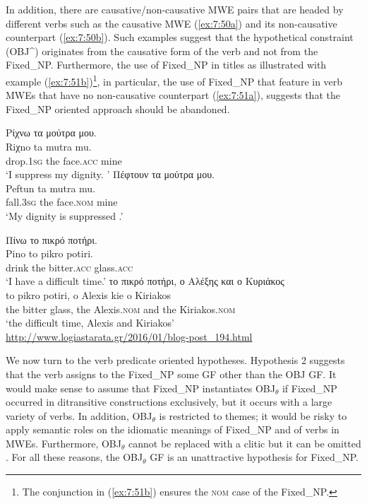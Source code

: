 \documentclass[output=paper]{langsci/langscibook}
\begin{document}
In addition, there are causative/non-causative MWE pairs that are headed by different verbs such as the causative MWE (\ref{ex:7:50a}) and its non-causative counterpart (\ref{ex:7:50b}). Such examples suggest that the hypothetical constraint (OBJ\^{})  originates from  the causative form of the verb and not from the Fixed\_NP. Furthermore, the use of Fixed\_NP in titles as illustrated with example (\ref{ex:7:51b})\footnote{The conjunction in (\ref{ex:7:51b}) ensures the \textsc{nom} case of  the Fixed\_NP.}, in particular, the use of Fixed\_NP that feature in verb MWEs that have no non-causative counterpart (\ref{ex:7:51a}), suggests that the Fixed\_NP oriented approach should be abandoned.   


\ea%
\label{ex:7:50}
\ea \label{ex:7:50a}
\glll Ρίχνω τα μούτρα μου.\\
Riχno ta mutra mu.\\
        drop.\textsc{1sg} the face.\textsc{acc} mine\\
\glt `I suppress my dignity. '
\ex \label{ex:7:50b}
\glll Πέφτουν τα μούτρα μου.\\
Peftun ta mutra mu.\\
         fall.\textsc{3sg} the face.\textsc{nom} mine\\
\glt   `My dignity is suppressed .'
\z
\z


\ea%
\label{ex:7:51}
\ea \label{ex:7:51a}
\glll Πίνω το πικρό ποτήρι.\\
Pino to pikro potiri.\\
            drink the bitter.\textsc{acc} glass.\textsc{acc}\\
\glt   `I have a difficult time.'
\ex \label{ex:7:51b}
\glll το πικρό ποτήρι, ο Αλέξης και ο Κυριάκος\\
to pikro potiri, o Alexis kie o Kiriakos\\
     the bitter glass, the Alexis.\textsc{nom} and the Kiriakos.\textsc{nom}\\
\glt   `the difficult time, Alexis and Kiriakos'\\
\url{http://www.logiastarata.gr/2016/01/blog-post_194.html} 
\z
\z

We now turn to the verb predicate oriented hypotheses. Hypothesis 2 suggests that the verb assigns to the Fixed\_NP some GF other than the OBJ GF.  It would make sense to assume that Fixed\_NP instantiates OBJ$_\theta$ if Fixed\_NP occurred in ditransitive constructions exclusively, but it occurs with a large variety of verbs. In addition, OBJ$_\theta$ is restricted to themes; it would be risky to apply semantic roles on the idiomatic meanings of Fixed\_NP and of verbs in MWEs.  Furthermore, OBJ$_\theta$ cannot be replaced with a clitic  but it can be omitted \citep{kordoni2004}.  For all these reasons, the OBJ$_\theta$ GF is an unattractive hypothesis for Fixed\_NP.
\end{document}
